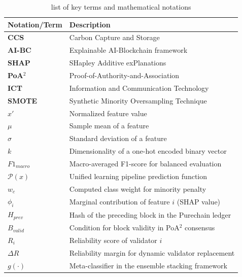 \documentclass[conference]{IEEEtran}
\begin{document}
\begin{table}[htbp]
\caption{list of key terms and mathematical notations}
\label{table:nomenclature}
\centering
\begin{tabular}{ll}
\hline \toprule
\textbf{Notation/Term} & \textbf{Description} \\ \hline
\textbf{CCS} & Carbon Capture and Storage \\
\textbf{AI-BC} & Explainable AI-Blockchain framework \\
\textbf{SHAP} & SHapley Additive exPlanations \\
\textbf{PoA$^{2}$} & Proof-of-Authority-and-Association \\
\textbf{ICT} & Information and Communication Technology \\
\textbf{SMOTE} & Synthetic Minority Oversampling Technique \\
$x'$ & Normalized feature value \\
$\mu$ & Sample mean of a feature \\
$\sigma$ & Standard deviation of a feature \\
$k$ & Dimensionality of a one-hot encoded binary vector \\
$F1_{macro}$ & Macro-averaged F1-score for balanced evaluation \\
$\mathcal{P}(x)$ & Unified learning pipeline prediction function \\
$w_{c}$ & Computed class weight for minority penalty \\
$\phi_{i}$ & Marginal contribution of feature $i$ (SHAP value) \\
$H_{prev}$ & Hash of the preceding block in the Purechain ledger \\
$B_{valid}$ & Condition for block validity in PoA$^{2}$ consensus \\
$R_{i}$ & Reliability score of validator $i$ \\
$\Delta R$ & Reliability margin for dynamic validator replacement \\
$g(\cdot)$ & Meta-classifier in the ensemble stacking framework \\
\hline \toprule
\end{tabular}
\end{table}
\end{document}
